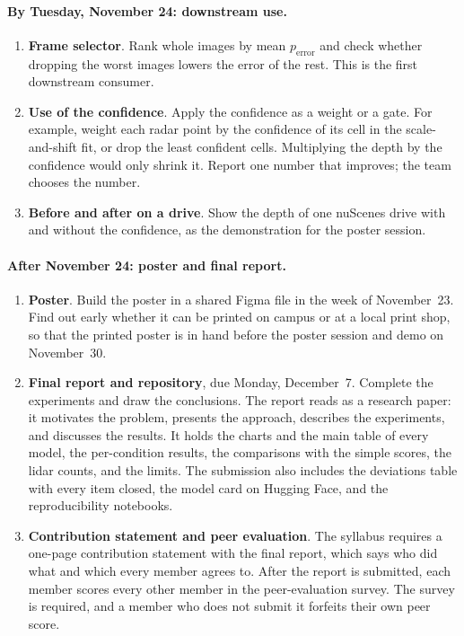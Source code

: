 \paragraph{By Tuesday, November 24: downstream use.}
\begin{enumerate}[leftmargin=*, itemsep=2pt, topsep=2pt, resume]
  \item \textbf{Frame selector}. Rank whole images by mean $p_\mathrm{error}$ and check whether dropping the worst images lowers the error of the rest. This is the first downstream consumer.
  \item \textbf{Use of the confidence}. Apply the confidence as a weight or a gate. For example, weight each radar point by the confidence of its cell in the scale-and-shift fit, or drop the least confident cells. Multiplying the depth by the confidence would only shrink it. Report one number that improves; the team chooses the number.
  \item \textbf{Before and after on a drive}. Show the depth of one nuScenes drive with and without the confidence, as the demonstration for the poster session.
\end{enumerate}

\paragraph{After November 24: poster and final report.}
\begin{enumerate}[leftmargin=*, itemsep=2pt, topsep=2pt, resume]
  \item \textbf{Poster}. Build the poster in a shared Figma file in the week of November~23. Find out early whether it can be printed on campus or at a local print shop, so that the printed poster is in hand before the poster session and demo on November~30.
  \item \textbf{Final report and repository}, due Monday, December~7. Complete the experiments and draw the conclusions. The report reads as a research paper: it motivates the problem, presents the approach, describes the experiments, and discusses the results. It holds the charts and the main table of every model, the per-condition results, the comparisons with the simple scores, the lidar counts, and the limits. The submission also includes the deviations table with every item closed, the model card on Hugging Face, and the reproducibility notebooks.
  \item \textbf{Contribution statement and peer evaluation}. The syllabus requires a one-page contribution statement with the final report, which says who did what and which every member agrees to. After the report is submitted, each member scores every other member in the peer-evaluation survey. The survey is required, and a member who does not submit it forfeits their own peer score.
\end{enumerate}

